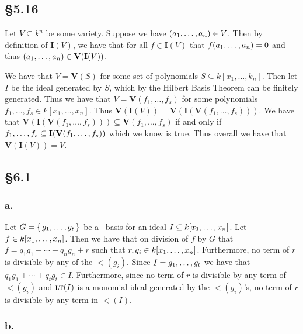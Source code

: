 \documentclass[letterpaper]{article}
\begin{document}
\subsection*{\S 5.16}

Let $V \subseteq k^{n}$ be some variety.
Suppose we have $\pqty{a_{1}, \ldots, a_{n}} \in V$.
Then by definition of $\mathbf{I}(V)$, we have that for all $f \in \mathbf{I}(V)$ that $f\pqty{a_{1}, \ldots, a_{n}} = 0$ and thus $\pqty{a_{1}, \ldots, a_{n}} \in \textbf{V}(\mathbf{I}(V))$.

We have that $V = \textbf{V}(S)$ for some set of polynomials $S \subseteq k[x_{1}, \ldots, k_{n}]$.
Then let $I$ be the ideal generated by $S$, which by the Hilbert Basis Theorem can be finitely generated.
Thus we have that $V = \textbf{V}(f_{1}, \ldots, f_{s})$ for some polynomials $f_{1}, \ldots, f_{s} \in k[x_{1}, \ldots, x_{n}]$.
Thus $\textbf{V}(\mathbf{I}(V)) = \textbf{V}(\mathbf{I}(\textbf{V}(f_{1}, \ldots, f_{s})))$.
We have that $\textbf{V}(\mathbf{I}(\textbf{V}(f_{1}, \ldots, f_{s}))) \subseteq \textbf{V}(f_{1}, \ldots, f_{s})$ if and only if $\gen{f_{1}, \ldots, f_{s}} \subseteq \mathbf{I}(\textbf{V}(f_{1}, \ldots, f_{s}))$ which we know is true.
Thus overall we have that $\textbf{V}(\mathbf{I}(V)) = V$.

\subsection*{\S 6.1}

\subsubsection*{a.}

Let $G = \set{g_{1}, \ldots, g_{t}}$ be a \Grobner\ basis for an ideal $I \subseteq k\bqty{x_{1}, \ldots, x_{n}}$.
Let $f \in k\bqty{x_{1}, \ldots, x_{n}}$.
Then we have that on division of $f$ by $G$ that $f = q_{1}g_{1} + \cdots + q_{n}g_{n} + r$ such that $r, q_{i} \in k\bqty{x_{1}, \ldots, x_{n}}$.
Furthermore, no term of $r$ is divisible by any of the $\lt(g_{i})$.
Since $I = \gen{g_{1}, \ldots, g_{t}}$ we have that $q_{1}g_{1} + \cdots + q_{t}g_{t} \in I$.
Furthermore, since no term of $r$ is divisible by any term of $\lt(g_{i})$ and $\gen{\lt(I)}$ is a monomial ideal generated by the $\lt(g_{i})$'s, no term of $r$ is divisible by any term in $\lt(I)$.

\subsubsection*{b.}
\end{document}
